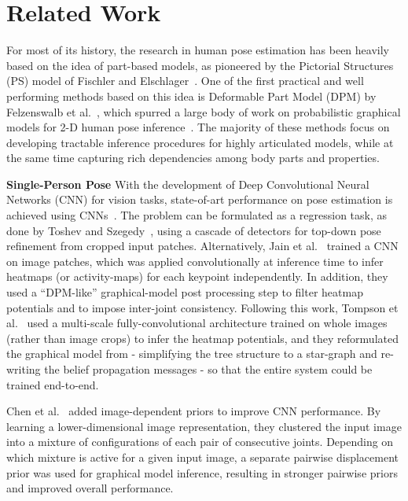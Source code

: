 \documentclass[10pt,twocolumn,letterpaper]{article}
\begin{document}
 \section{Related Work}



For most of its history, the research in human pose estimation has been heavily based on the idea of part-based models, as pioneered by the Pictorial Structures (PS) model of Fischler and Elschlager~\cite{Fischler73}. One of the first practical and well performing methods based on this idea is Deformable Part Model (DPM) by Felzenswalb et al.~\cite{FelzenszwalbDPM}, which spurred a large body of work on probabilistic graphical models for 2-D human pose inference~\cite{andriluka2009pictorial, BetterAppearancePic, Sapp2010, yang11cvpr, dantone13cvpr, johnson11cvpr, pishchulin13cvpr, modec2013, armlets2013}. The majority of these methods focus on developing tractable inference procedures for highly articulated models, while at the same time capturing rich dependencies among body parts and properties.







\textbf{Single-Person Pose}
With the development of Deep Convolutional Neural Networks (CNN) for vision tasks, state-of-art performance on pose estimation is achieved using CNNs~\cite{deeppose, jainiclr2014, tompsonnips2014, Chen_NIPS14, stackedhourglass, andriluka14cvpr, bulat2016, zisserman2016, chain16, deeper_cut, cmu_mscoco}.
The problem can be formulated as a regression task, as done by Toshev and Szegedy~\cite{deeppose}, using a cascade of detectors for top-down pose refinement from cropped input patches. 
Alternatively, Jain et al.~\cite{jainiclr2014} trained a CNN on image patches, which was applied convolutionally at inference time to infer heatmaps (or activity-maps) for each keypoint independently. In addition, they used a ``DPM-like'' graphical-model post processing step to filter heatmap potentials and to impose inter-joint consistency. Following this work, Tompson et al.~\cite{tompsonnips2014} used a multi-scale fully-convolutional architecture trained on whole images (rather than image crops) to infer the heatmap potentials, and they reformulated the graphical model from \cite{jainiclr2014} - simplifying the tree structure to a star-graph and re-writing the belief propagation messages - so that the entire system could be trained end-to-end.

Chen et al.~\cite{Chen_NIPS14} added image-dependent priors to improve CNN performance. By learning a lower-dimensional image representation, they clustered the input image into a mixture of configurations of each pair of consecutive joints. Depending on which mixture is active for a given input image, a separate pairwise displacement prior was used for graphical model inference, resulting in stronger pairwise priors and improved overall performance. 
\end{document}
